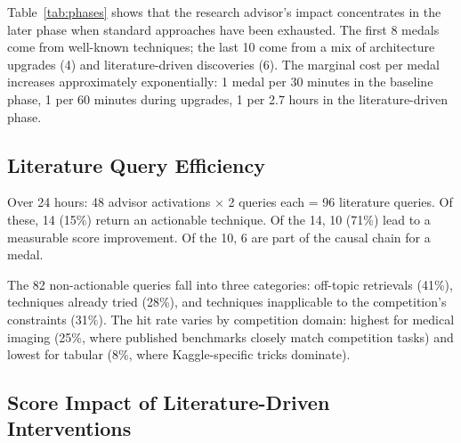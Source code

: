\documentclass{article}
\begin{document}
Table~\ref{tab:phases} shows that the research advisor's impact concentrates in the later phase when standard approaches have been exhausted. The first 8 medals come from well-known techniques; the last 10 come from a mix of architecture upgrades (4) and literature-driven discoveries (6). The marginal cost per medal increases approximately exponentially: 1 medal per 30 minutes in the baseline phase, 1 per 60 minutes during upgrades, 1 per 2.7 hours in the literature-driven phase.

\subsection{Literature Query Efficiency}

Over 24 hours: 48 advisor activations $\times$ 2 queries each = 96 literature queries. Of these, 14 (15\%) return an actionable technique. Of the 14, 10 (71\%) lead to a measurable score improvement. Of the 10, 6 are part of the causal chain for a medal.

The 82 non-actionable queries fall into three categories: off-topic retrievals (41\%), techniques already tried (28\%), and techniques inapplicable to the competition's constraints (31\%). The hit rate varies by competition domain: highest for medical imaging (25\%, where published benchmarks closely match competition tasks) and lowest for tabular (8\%, where Kaggle-specific tricks dominate).

\subsection{Score Impact of Literature-Driven Interventions}
\end{document}
